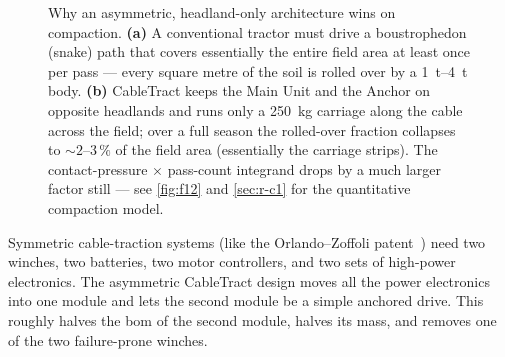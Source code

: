 \documentclass[11pt,a4paper]{article}
\begin{document}
\begin{figure}[H]
\caption{Why an asymmetric, headland-only architecture wins on compaction. \textbf{(a)} A conventional tractor must drive a boustrophedon (snake) path that covers essentially the entire field area at least once per pass --- every square metre of the soil is rolled over by a \SIrange{1}{4}{\tonne} body. \textbf{(b)} CableTract keeps the Main Unit and the Anchor on opposite headlands and runs only a \SI{250}{\kilogram} carriage along the cable across the field; over a full season the rolled-over fraction collapses to ${\sim}2\text{--}3\,\%$ of the field area (essentially the carriage strips). The contact-pressure $\times$ pass-count integrand drops by a much larger factor still --- see \cref{fig:f12} and \cref{sec:r-c1} for the quantitative compaction model.}
\label{fig:f0d}
\end{figure}

Symmetric cable-traction systems (like the Orlando--Zoffoli patent~\cite{orlando2014patent}) need two winches, two batteries, two motor controllers, and two sets of high-power electronics. The asymmetric CableTract design moves all the power electronics into one module and lets the second module be a simple anchored drive. This roughly halves the \gls{bom} of the second module, halves its mass, and removes one of the two failure-prone winches.
\end{document}
